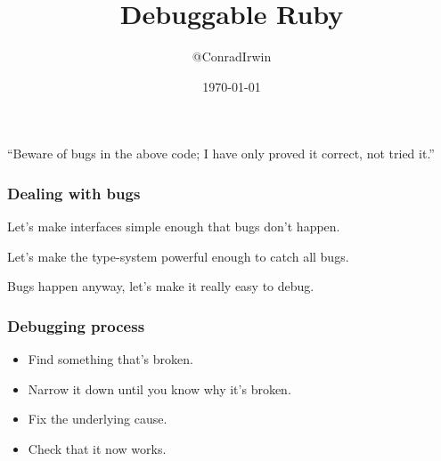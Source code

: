 \documentclass[14pt]{beamer}
\newlength{\wideitemsep}
\let\olditem\item
\renewcommand{\item}{\setlength{\itemsep}{\wideitemsep}\olditem}
\begin{document}
\title{Debuggable Ruby}
\author{@ConradIrwin}
\date{\today}
\frame{\titlepage}

{
\begin{frame}[plain]
\end{frame}
}

\frame
{
  \begin{exampleblock}{}
    {\large ``Beware of bugs in the above code; I have only proved it correct, not tried it.''}
    \vskip5mm
    \hspace*{}
  \end{exampleblock}
}

\frame
{
  \frametitle{Dealing with bugs}

  \begin{description}
  \item[Java]<1-> Let's make interfaces simple enough that bugs don't happen.
  \item[Haskell]<2-> Let's make the type-system powerful enough to catch all bugs.
  \item[Ruby]<3-> Bugs happen anyway, let's make it really easy to debug.
  \end{description}
}

\frame
{
  \frametitle{Debugging process}

  \begin{itemize}
  \item Find something that's broken.
  \item Narrow it down until you know why it's broken.
  \item Fix the underlying cause.
  \item Check that it now works.
  \end{itemize}
}
\end{document}

